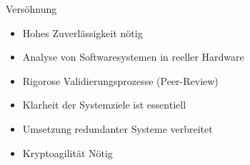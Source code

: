\begin{frame}[T]{Versöhnung} %
  \begin{itemize}
    \item Hohes Zuverlässigkeit nötig
    \item Analyse von Softwaresystemen in reeller Hardware
    \item Rigorose Validierungsprozesse (Peer-Review)
    \item Klarheit der Systemziele ist essentiell
    \item Umsetzung redundanter Systeme verbreitet
    \item Kryptoagilität Nötig
  \end{itemize}
\end{frame}
